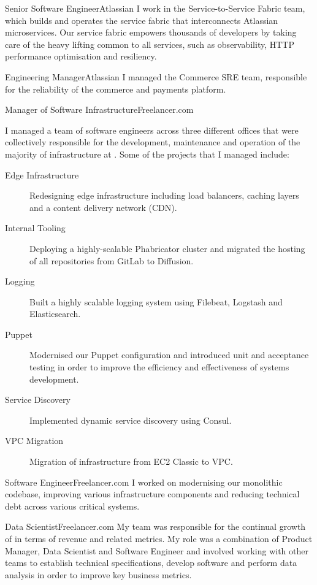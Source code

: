 \begin{professionalExperience}

{Senior Software Engineer}{Atlassian}
{
  I work in the Service-to-Service Fabric team, which builds and operates the
  service fabric that interconnects Atlassian microservices. Our service fabric
  empowers thousands of developers by taking care of the heavy lifting common to
  all services, such as observability, HTTP performance optimisation and
  resiliency.
}

{Engineering Manager}{Atlassian}
{
  I managed the Commerce SRE team, responsible for the reliability of the
  commerce and payments platform.
}

{Manager of Software Infrastructure}{Freelancer.com}
{
  I managed a team of software engineers across three different offices that
  were collectively responsible for the development, maintenance and operation
  of the majority of infrastructure at . Some of the
  projects that I managed include:

  \begin{description}
    \item[Edge Infrastructure] Redesigning edge infrastructure including load
      balancers, caching layers and a content delivery network (CDN).
    \item[Internal Tooling] Deploying a highly-scalable Phabricator cluster and
      migrated the hosting of all repositories from GitLab to Diffusion.
    \item[Logging] Built a highly scalable logging system using Filebeat,
      Logstash and Elasticsearch.
    \item[Puppet] Modernised our Puppet configuration and introduced unit and
      acceptance testing in order to improve the efficiency and effectiveness of
      systems development.
    \item[Service Discovery] Implemented dynamic service discovery using Consul.
    \item[VPC Migration] Migration of infrastructure from EC2 Classic to VPC\@.
  \end{description}
}

{Software Engineer}{Freelancer.com}
{
  I worked on modernising our monolithic codebase, improving various
  infrastructure components and reducing technical debt across various critical
  systems.
}

{Data Scientist}{Freelancer.com}
{
  My team was responsible for the continual growth of 
  in terms of revenue and related metrics. My role was a combination of Product
  Manager, Data Scientist and Software Engineer and involved working with other
  teams to establish technical specifications, develop software and perform data
  analysis in order to improve key business metrics.
}

\end{professionalExperience}
